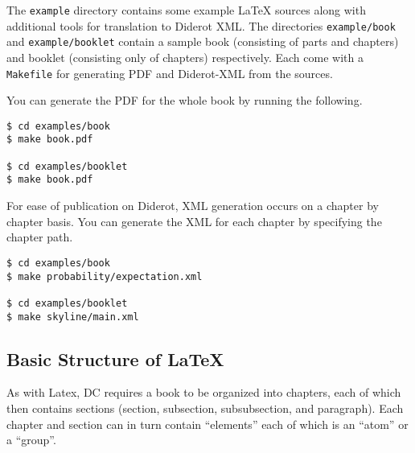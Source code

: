 \begin{example}
The \lstinline`example` directory contains some example LaTeX sources along with additional tools for translation to Diderot XML.
%
The directories \lstinline`example/book` and \lstinline`example/booklet` contain a sample book (consisting of parts and chapters) and booklet (consisting only of chapters) respectively.
%
Each come with a  \lstinline`Makefile` for generating PDF and Diderot-XML from the sources. 
\end{example}

\begin{example}
You can generate the PDF for the whole book by running the following.
%
\begin{lstlisting}
$ cd examples/book
$ make book.pdf

$ cd examples/booklet
$ make book.pdf
\end{lstlisting}
\end{example}

\begin{example}
For ease of publication on Diderot, XML generation occurs on a chapter by chapter basis.
%
You can generate the XML for  each chapter by specifying the chapter path.
\begin{lstlisting}
$ cd examples/book
$ make probability/expectation.xml

$ cd examples/booklet
$ make skyline/main.xml
\end{lstlisting}
\end{example}


\subsection{Basic Structure of LaTeX} 

As with Latex, DC requires a book to be organized into chapters, each of which then contains sections (section, subsection, subsubsection, and paragraph).  Each chapter and section can in turn contain ``elements'' each of which is an ``atom'' or a  ``group''.


